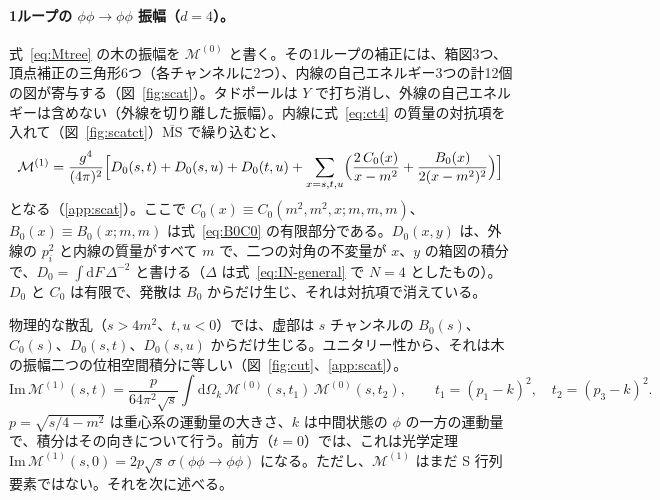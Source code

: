 \documentclass[a4paper,10pt]{ltjsarticle}
\newcommand{\dd}{\mathrm{d}}
\begin{document}
\paragraph{1ループの $\phi\phi\to\phi\phi$ 振幅（$d=4$）。}式~\eqref{eq:Mtree} の木の振幅を $\mathcal{M}^{(0)}$ と書く。その1ループの補正には、箱図3つ、頂点補正の三角形6つ（各チャンネルに2つ）、内線の自己エネルギー3つの計12個の図が寄与する（図~\ref{fig:scat}）。タドポールは $Y$ で打ち消し、外線の自己エネルギーは含めない（外線を切り離した振幅）。内線に式~\eqref{eq:ct4} の質量の対抗項を入れて（図~\ref{fig:scatct}）$\overline{\mathrm{MS}}$ で繰り込むと、
\begin{equation}
\mathcal{M}^{(1)}=\frac{g^4}{(4\pi)^2}\Bigl[D_0(s,t)+D_0(s,u)+D_0(t,u)+\sum_{x=s,t,u}\Bigl(\frac{2\,C_0(x)}{x-m^2}+\frac{B_0(x)}{2(x-m^2)^2}\Bigr)\Bigr]
\label{eq:M1}
\end{equation}
となる（\ref{app:scat}）。ここで $C_0(x)\equiv C_0(m^2,m^2,x;m,m,m)$、$B_0(x)\equiv B_0(x;m,m)$ は式~\eqref{eq:B0C0} の有限部分である。$D_0(x,y)$ は、外線の $p_i^2$ と内線の質量がすべて $m$ で、二つの対角の不変量が $x$、$y$ の箱図の積分で、$D_0=\int\dd F\,\Delta^{-2}$ と書ける（$\Delta$ は式~\eqref{eq:IN-general} で $N=4$ としたもの）。$D_0$ と $C_0$ は有限で、発散は $B_0$ からだけ生じ、それは対抗項で消えている。

物理的な散乱（$s>4m^2$、$t,u<0$）では、虚部は $s$ チャンネルの $B_0(s)$、$C_0(s)$、$D_0(s,t)$、$D_0(s,u)$ からだけ生じる。ユニタリー性から、それは木の振幅二つの位相空間積分に等しい（図~\ref{fig:cut}、\ref{app:scat}）。
\begin{equation}
\mathrm{Im}\,\mathcal{M}^{(1)}(s,t)=\frac{p}{64\pi^2\sqrt s}\int\!\dd\Omega_k\,\mathcal{M}^{(0)}(s,t_1)\,\mathcal{M}^{(0)}(s,t_2),\qquad
t_1=(p_1-k)^2,\quad t_2=(p_3-k)^2 .
\label{eq:unit}
\end{equation}
$p=\sqrt{s/4-m^2}$ は重心系の運動量の大きさ、$k$ は中間状態の $\phi$ の一方の運動量で、積分はその向きについて行う。前方（$t=0$）では、これは光学定理 $\mathrm{Im}\,\mathcal{M}^{(1)}(s,0)=2p\sqrt s\,\sigma(\phi\phi\to\phi\phi)$ になる。ただし、$\mathcal{M}^{(1)}$ はまだ S 行列要素ではない。それを次に述べる。
\end{document}
